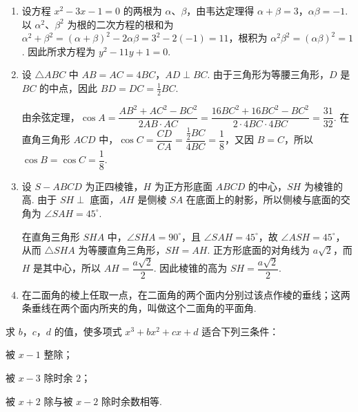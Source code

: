 \documentclass[UTF8,a4paper,oneside,11pt]{ctexbook}
\begin{document}
\begin{solution}
\begin{enumerate}
\item
设方程 \(x^{2}-3x-1=0\) 的两根为 \(\alpha\)、\(\beta\)，由韦达定理得 \(\alpha+\beta=3\)，\(\alpha\beta=-1\). 以 \(\alpha^{2}\)、\(\beta^{2}\) 为根的二次方程的根和为 \(\alpha^{2}+\beta^{2}=\left(\alpha+\beta\right)^{2}-2\alpha\beta=3^{2}-2\left(-1\right)=11\)，根积为 \(\alpha^{2}\beta^{2}=\left(\alpha\beta\right)^{2}=1\). 因此所求方程为 \(y^{2}-11y+1=0\).

\item
设 \(\triangle ABC\) 中 \(AB=AC=4BC\)，\(AD\perp BC\). 由于三角形为等腰三角形，\(D\) 是 \(BC\) 的中点，因此 \(BD=DC=\frac{1}{2}BC\).


由余弦定理，\(\cos A=\dfrac{AB^{2}+AC^{2}-BC^{2}}{2AB\cdot AC}=\dfrac{16BC^{2}+16BC^{2}-BC^{2}}{2\cdot 4BC\cdot 4BC}=\dfrac{31}{32}\). 在直角三角形 \(ACD\) 中，\(\cos C=\dfrac{CD}{CA}=\dfrac{\frac{1}{2}BC}{4BC}=\dfrac{1}{8}\)，又因 \(B=C\)，所以 \(\cos B=\cos C=\dfrac{1}{8}\).

\item
设 \(S-ABCD\) 为正四棱锥，\(H\) 为正方形底面 \(ABCD\) 的中心，\(SH\) 为棱锥的高. 由于 \(SH\perp\) 底面，\(AH\) 是侧棱 \(SA\) 在底面上的射影，所以侧棱与底面的交角为 \(\angle SAH=45^{\circ}\).


在直角三角形 \(SHA\) 中，\(\angle SHA=90^{\circ}\)，且 \(\angle SAH=45^{\circ}\)，故 \(\angle ASH=45^{\circ}\)，从而 \(\triangle SHA\) 为等腰直角三角形，\(SH=AH\). 正方形底面的对角线为 \(a\sqrt{2}\)，而 \(H\) 是其中心，所以 \(AH=\dfrac{a\sqrt{2}}{2}\). 因此棱锥的高为 \(SH=\dfrac{a\sqrt{2}}{2}\).

\item
在二面角的棱上任取一点，在二面角的两个面内分别过该点作棱的垂线；这两条垂线在两个面内所夹的角，叫做这个二面角的平面角.
\end{enumerate}
\end{solution}

\begin{problem}
求 \(b\)，\(c\)，\(d\) 的值，使多项式 \(x^{3}+bx^{2}+cx+d\) 适合下列三条件：

\begin{circlelist}
\item 被 \(x-1\) 整除；
\item 被 \(x-3\) 除时余 \(2\)；
\item 被 \(x+2\) 除与被 \(x-2\) 除时余数相等.
\end{circlelist}
\end{problem}
\end{document}
